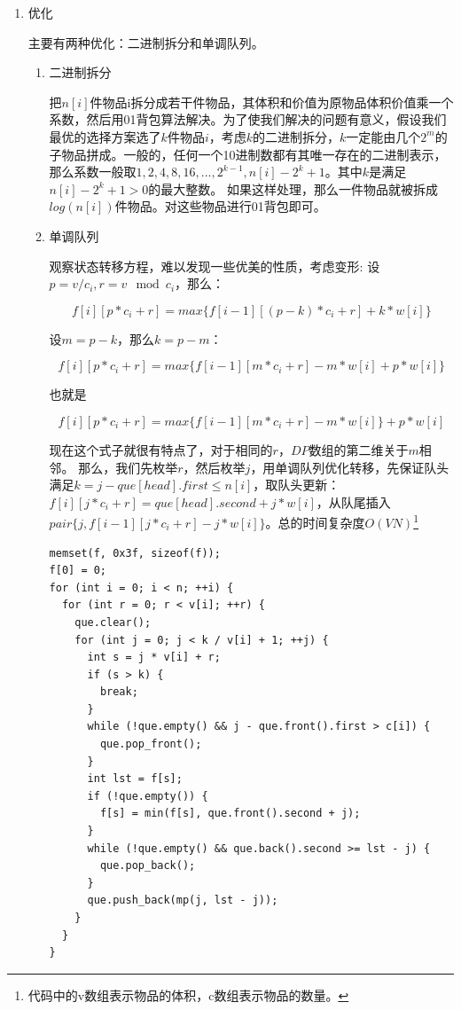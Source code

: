 \documentclass[11pt]{article}
\begin{document}
\begin{enumerate}
\item 优化
\label{sec-5-2-3-1}

主要有两种优化：二进制拆分和单调队列。

\begin{enumerate}
\item 二进制拆分
\label{sec-5-2-3-1-1}


把\(n[i]\)件物品i拆分成若干件物品，其体积和价值为原物品体积价值乘一个系数，然后用01背包算法解决。为了使我们解决的问题有意义，假设我们最优的选择方案选了\(k\)件物品\(i\)，考虑\(k\)的二进制拆分，\(k\)一定能由几个\(2^m\)的子物品拼成。一般的，任何一个10进制数都有其唯一存在的二进制表示，那么系数一般取\(1,2,4,8,16,...,2^{k-1},n[i]-2^{k}+1\)。其中\(k\)是满足\(n[i]-2^k+1>0\)的最大整数。  
如果这样处理，那么一件物品就被拆成\(log(n[i])\)件物品。对这些物品进行01背包即可。

\item 单调队列
\label{sec-5-2-3-1-2}


观察状态转移方程，难以发现一些优美的性质，考虑变形:  
设\(p=v/c_{i},r=v \mod c_i\)，那么：

$$
f[i][p*c_i+r]=max\{f[i-1][(p-k)*c_i+r]+k*w[i]\}
$$

设\(m=p-k\)，那么\(k=p-m\)：

$$
f[i][p*c_i+r]=max\{f[i-1][m*c_i+r]-m*w[i]+p*w[i]\}
$$

也就是

$$
f[i][p*c_i+r]=max\{f[i-1][m*c_i+r]-m*w[i]\}+p*w[i]
$$

现在这个式子就很有特点了，对于相同的\(r\)，\(DP\)数组的第二维关于\(m\)相邻。  
那么，我们先枚举\(r\)，然后枚举\(j\)，用单调队列优化转移，先保证队头满足\(k=j-que[head].first \leq n[i]\)，取队头更新：\(f[i][j*c_i+r]=que[head].second+j*w[i]\)，从队尾插入\(pair\{j,f[i-1][j*c_i+r]-j*w[i]\}\)。总的时间复杂度\(O(V N)\)\footnote{代码中的v数组表示物品的体积，c数组表示物品的数量。}

\begin{verbatim}
memset(f, 0x3f, sizeof(f));
f[0] = 0;
for (int i = 0; i < n; ++i) {
  for (int r = 0; r < v[i]; ++r) {
    que.clear();
    for (int j = 0; j < k / v[i] + 1; ++j) {
      int s = j * v[i] + r;
      if (s > k) {
        break;
      }
      while (!que.empty() && j - que.front().first > c[i]) {
        que.pop_front();
      }
      int lst = f[s];
      if (!que.empty()) {
        f[s] = min(f[s], que.front().second + j);
      }
      while (!que.empty() && que.back().second >= lst - j) {
        que.pop_back();
      }
      que.push_back(mp(j, lst - j));
    }
  }
}
\end{verbatim}
\end{enumerate}
\end{enumerate}
\end{document}
